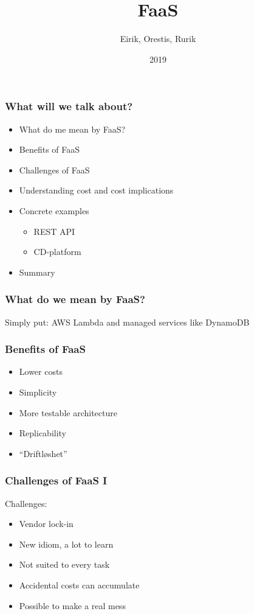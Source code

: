 \documentclass{beamer}
\title{FaaS}
\author{Eirik, Orestis, Rurik}
\institute{Institute for Economic Affairs — ML-faktion}
\date{2019}
\begin{document}
\frame{\titlepage}

\begin{frame}
\frametitle{What will we talk about?}
\begin{itemize}
  \item What do me mean by FaaS?
  \item Benefits of FaaS
  \item Challenges of FaaS
  \item Understanding cost and cost implications
  \item Concrete examples
  \begin{itemize}
    \item REST API
    \item CD-platform
  \end{itemize}
  \item Summary
\end{itemize}
\end{frame}

\begin{frame}
\frametitle{What do we mean by FaaS?}
Simply put: AWS Lambda and managed services like DynamoDB
\end{frame}

\begin{frame}
\frametitle{Benefits of FaaS}
\begin{itemize}
  \item Lower costs
  \item Simplicity
  \item More testable architecture
  \item Replicability
  \item ``Driftløshet''
\end{itemize}
\end{frame}

\begin{frame}
\frametitle{Challenges of FaaS I}
Challenges:
\begin{itemize}
  \item Vendor lock-in
  \item New idiom, a lot to learn
  \item Not suited to every task
  \item Accidental costs can accumulate
  \item Possible to make a real mess
\end{itemize}
\end{frame}
\end{document}
